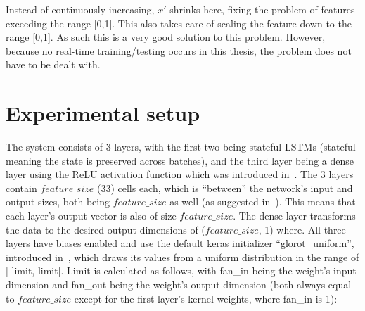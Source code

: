 Instead of continuously increasing, \(x'\) shrinks here, fixing the problem of features exceeding the range [0,1]. This also takes care of scaling the feature down to the range [0,1]. As such this is a very good solution to this problem. However, because no real-time training/testing occurs in this thesis, the problem does not have to be dealt with.












\section{Experimental setup}
The system consists of 3 layers, with the first two being stateful LSTMs (stateful meaning the state is preserved across batches), and the third layer being a dense layer using the ReLU activation function which was introduced in~\cite{hahnloser2000digital}. The 3 layers contain \(feature\_size\) (33) cells each, which is \enquote{between} the network's input and output sizes, both being \(feature\_size\) as well (as suggested in~\cite{heaton2008introduction}). This means that each layer's output vector is also of size \(feature\_size\). The dense layer transforms the data to the desired output dimensions of (\(feature\_size\), 1) where. All three layers have biases enabled and use the default keras initializer \enquote{glorot\_uniform}, introduced in~\cite{glorot2010understanding}, which draws its values from a uniform distribution in the range of [-limit, limit]. Limit is calculated as follows, with fan\_in being the weight's input dimension and fan\_out being the weight's output dimension (both always equal to \(feature\_size\) except for the first layer's kernel weights, where fan\_in is 1):

